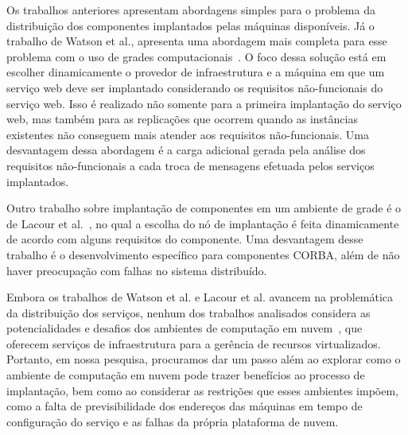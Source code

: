 Os trabalhos anteriores apresentam abordagens simples para o problema da distribuição dos componentes implantados pelas máquinas disponíveis. Já o trabalho de Watson et al., apresenta uma abordagem mais completa para esse problema com o uso de grades computacionais~\cite{Watson2006Dynasoar}. O foco dessa solução está em escolher dinamicamente o provedor de infraestrutura e a máquina em que um serviço web deve ser implantado considerando os requisitos não-funcionais do serviço web. Isso é realizado não somente para a primeira implantação do serviço web, mas também para as replicações que ocorrem quando as instâncias existentes não conseguem mais atender aos requisitos não-funcionais. Uma desvantagem dessa abordagem é a carga adicional gerada pela análise dos requisitos não-funcionais a cada troca de mensagens efetuada pelos serviços implantados. 

Outro trabalho sobre implantação de componentes em um ambiente de grade é o de Lacour et al.~\cite{Lacour2004Corba}, no qual a escolha do nó de implantação é feita dinamicamente de acordo com alguns requisitos do componente. Uma desvantagem desse trabalho é o desenvolvimento específico para componentes CORBA, além de não haver preocupação com falhas no sistema distribuído.

Embora os trabalhos de Watson et al. e Lacour et al. avancem na problemática da distribuição dos serviços, nenhum dos trabalhos analisados considera as potencialidades e desafios dos ambientes de computação em nuvem~\cite{Amazon2012Practices}, que oferecem serviços de infraestrutura para a gerência de recursos virtualizados. Portanto, em nossa pesquisa, procuramos dar um passo além ao explorar como o ambiente de computação em nuvem pode trazer benefícios ao processo de implantação, bem como ao considerar as restrições que esses ambientes impõem, como a falta de previsibilidade dos endereços das máquinas em tempo de configuração do serviço e as falhas da própria plataforma de nuvem.

